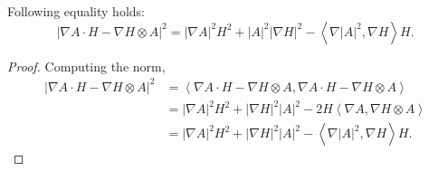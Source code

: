 \begin{comment}
\begin{lemma}
    \begin{equation}
        | H \cdot\nabla_{i} h_{kl}  - \nabla_{i}H\cdot h_{kl}|^{2} = H^{2}| \nabla A|^{2}+ |A|^{2}| \nabla H|^{2}   - \left<  \nabla_{i}|A|^{2}, \nabla_{i}H \right>H
    \end{equation}
\end{lemma}
\begin{proof}
    \begin{align*}
        \left< H \cdot\nabla_{i} h_{kl}  - \nabla_{i}H\cdot h_{kl}, H \cdot\nabla_{i} h_{kl}  - \nabla_{i}H\cdot h_{kl} \right> & = H^{2}| \nabla A|^{2} + 
    \end{align*}
\end{proof} 
\end{comment}

\begin{lemma}
    Following equality holds: 
    \begin{equation}
        |\nabla A \cdot H - \nabla H \otimes A|^{2} = | \nabla A|^{2}H^{2} + |A|^{2}| \nabla H|^{2} - \left<  \nabla |A|^{2}, \nabla H \right>H.
    \end{equation}
\end{lemma}
\begin{proof}
    Computing the norm, 
    \begin{align*}
        |\nabla A \cdot H - \nabla H \otimes A|^{2} & = \left<  \nabla A \cdot H - \nabla H \otimes A, \nabla A \cdot H - \nabla H \otimes A  \right> \\
        & = |\nabla A|^{2}H^{2} + |\nabla H|^{2}|A|^{2} - 2H\left< \nabla A, \nabla H \otimes A \right> \\
        & = |\nabla A|^{2}H^{2} + |\nabla H|^{2}|A|^{2} - \left< \nabla |A|^{2}, \nabla H \right>H.
    \end{align*}
\end{proof}



